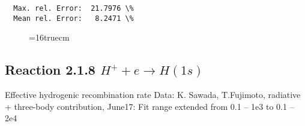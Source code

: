 \documentclass[12pt,dvipdfmx]{article}
\begin{document}
\begin{small}
\begin{verbatim}
  Max. rel. Error:  21.7976 \%
  Mean rel. Error:   8.2471 \%

\end{verbatim}\end{small}
\begin{figure} \label{2.1.8o}
\epsfxsize=16truecm
\end{figure}
\newpage

\subsection{
  Reaction 2.1.8 $ H^+ + e \rightarrow H(1s) $
}

   Effective hydrogenic recombination rate
   Data: K. Sawada, T.Fujimoto, radiative + three-body contribution, \cite{kn:Sawada}
   June17: Fit range extended from 0.1 -- 1e3 to 0.1 -- 2e4
\end{document}
